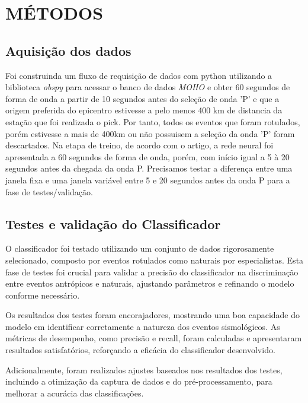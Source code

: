 \section{MÉTODOS}
\label{sec:metodos}

\subsection{Aquisição dos dados}
\label{subsec:aquisi_dado}
\par{Foi construinda um fluxo de requisição de dados com python utilizando a biblioteca \textit{obspy} para acessar o banco de dados \textit{MOHO} e obter 60 segundos de forma de onda a partir de 10 segundos antes do seleção de onda 'P' e que a origem preferida do epicentro estivesse a pelo menos 400 km de distancia da estação que foi realizada o pick. Por tanto, todos os eventos que foram rotulados, porém estivesse a mais de 400km ou não possuisem a seleção da onda 'P' foram descartados. Na etapa de treino, de acordo com o artigo, a rede neural foi apresentada a 60 segundos de forma de onda, porém, com início igual a 5 à 20 segundos antes da chegada da onda P. Precisamos testar a diferença entre uma janela fixa e uma janela variável entre 5 e 20 segundos antes da onda P para a fase de testes/validação.
}

\subsection{Testes e validação do Classificador}
\label{subsec:testes_validacao}
\par{O classificador foi testado utilizando um conjunto de dados rigorosamente selecionado, composto por eventos rotulados como naturais por especialistas. Esta fase de testes foi crucial para validar a precisão do classificador na discriminação entre eventos antrópicos e naturais, ajustando parâmetros e refinando o modelo conforme necessário.}

\par{Os resultados dos testes foram encorajadores, mostrando uma boa capacidade do modelo em identificar corretamente a natureza dos eventos sismológicos. As métricas de desempenho, como precisão e recall, foram calculadas e apresentaram resultados satisfatórios, reforçando a eficácia do classificador desenvolvido.}

\par{Adicionalmente, foram realizados ajustes baseados nos resultados dos testes, incluindo a otimização da captura de dados e do pré-processamento, para melhorar a acurácia das classificações.}

